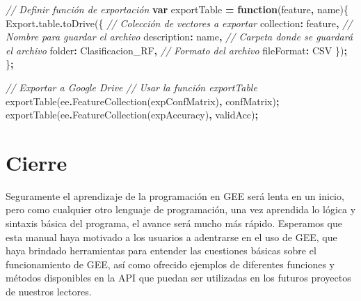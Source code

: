 \documentclass[
  12pt,
  letterpaper,
  twoside]{book}
\newenvironment{Shaded}{\begin{snugshade}}{\end{snugshade}}
\newcommand{\AttributeTok}[1]{\textcolor[rgb]{0.77,0.63,0.00}{#1}}
\newcommand{\CommentTok}[1]{\textcolor[rgb]{0.56,0.35,0.01}{\textit{#1}}}
\newcommand{\DataTypeTok}[1]{\textcolor[rgb]{0.13,0.29,0.53}{#1}}
\newcommand{\FunctionTok}[1]{\textcolor[rgb]{0.00,0.00,0.00}{#1}}
\newcommand{\KeywordTok}[1]{\textcolor[rgb]{0.13,0.29,0.53}{\textbf{#1}}}
\newcommand{\NormalTok}[1]{#1}
\newcommand{\OperatorTok}[1]{\textcolor[rgb]{0.81,0.36,0.00}{\textbf{#1}}}
\newcommand{\StringTok}[1]{\textcolor[rgb]{0.31,0.60,0.02}{#1}}
\begin{document}
\begin{Shaded}
\begin{Highlighting}[]
\CommentTok{// Definir función de exportación}
\KeywordTok{var}\NormalTok{ exportTable }\OperatorTok{=} \KeywordTok{function}\NormalTok{(feature}\OperatorTok{,}\NormalTok{ name)\{}
\NormalTok{  Export}\OperatorTok{.}\AttributeTok{table}\OperatorTok{.}\FunctionTok{toDrive}\NormalTok{(\{}
    \CommentTok{// Colección de vectores a exportar}
    \DataTypeTok{collection}\OperatorTok{:}\NormalTok{ feature}\OperatorTok{,}
    \CommentTok{// Nombre para guardar el archivo}
    \DataTypeTok{description}\OperatorTok{:}\NormalTok{ name}\OperatorTok{,}
    \CommentTok{// Carpeta donde se guardará el archivo}
    \DataTypeTok{folder}\OperatorTok{:} \StringTok{\textquotesingle{}Clasificacion\_RF\textquotesingle{}}\OperatorTok{,}
    \CommentTok{// Formato del archivo}
    \DataTypeTok{fileFormat}\OperatorTok{:} \StringTok{\textquotesingle{}CSV\textquotesingle{}}
\NormalTok{ \})}\OperatorTok{;}
\NormalTok{\}}\OperatorTok{;}

\CommentTok{// Exportar a Google Drive}
\CommentTok{// Usar la función exportTable}
\FunctionTok{exportTable}\NormalTok{(ee}\OperatorTok{.}\FunctionTok{FeatureCollection}\NormalTok{(expConfMatrix)}\OperatorTok{,} \StringTok{\textquotesingle{}confMatrix\textquotesingle{}}\NormalTok{)}\OperatorTok{;}
\FunctionTok{exportTable}\NormalTok{(ee}\OperatorTok{.}\FunctionTok{FeatureCollection}\NormalTok{(expAccuracy)}\OperatorTok{,} \StringTok{\textquotesingle{}validAcc\textquotesingle{}}\NormalTok{)}\OperatorTok{;}
\end{Highlighting}
\end{Shaded}

\newpage

\hypertarget{cierre}{%
\chapter{Cierre}\label{cierre}}

Seguramente el aprendizaje de la programación en GEE será lenta en un inicio, pero como cualquier otro lenguaje de programación, una vez aprendida lo lógica y sintaxis básica del programa, el avance será mucho más rápido. Esperamos que esta manual haya motivado a los usuarios a adentrarse en el uso de GEE, que haya brindado herramientas para entender las cuestiones básicas sobre el funcionamiento de GEE, así como ofrecido ejemplos de diferentes funciones y métodos disponibles en la API que puedan ser utilizadas en los futuros proyectos de nuestros lectores.
\end{document}
